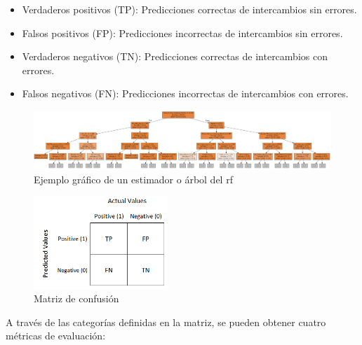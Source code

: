 \begin{itemize}
  \item Verdaderos positivos (TP): Predicciones correctas de intercambios sin errores.
  \item Falsos positivos (FP): Predicciones incorrectas de intercambios sin errores.
  \item Verdaderos negativos (TN): Predicciones correctas de intercambios con errores.
  \item Falsos negativos (FN): Predicciones incorrectas de intercambios con errores.
\end{itemize}

\begin{figure}
  \centering
  \includegraphics[width=1\textwidth]{img/desarrollo/rf/tree2.png}
  \caption{Ejemplo gráfico de un estimador o árbol del \gls{rf} \cite{graphviz}}
  \label{fig:tree}
\end{figure}

\begin{figure}[H]
  \centering
  \includegraphics[width=0.45\textwidth]{img/desarrollo/rf/confusion.png}
  \caption{Matriz de confusión \cite{cm2}}
  \label{fig:confusion}
\end{figure}

\vspace{3mm}

A través de las categorías definidas en la matriz, se pueden obtener cuatro métricas de evaluación: 

\vspace{3mm}

